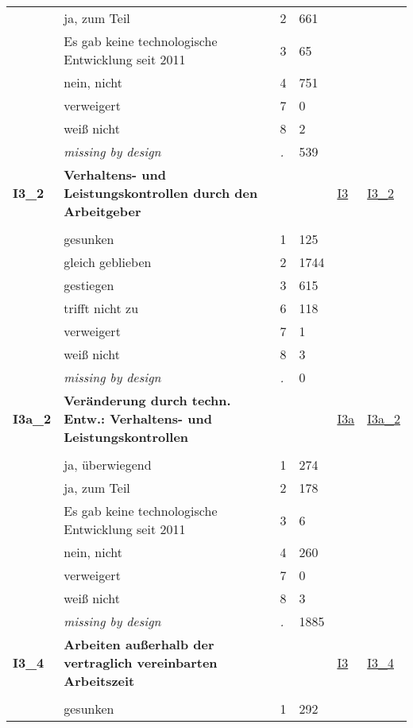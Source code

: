 \begin{longtable}{| L{2.45cm} | L{6cm} | C{1.5cm} | R{1cm} | C{2.25cm} | C{2.25cm} |}
   & ja, zum Teil & 2 & 661 &  &  \\ 
   & Es gab keine technologische Entwicklung seit 2011 & 3 & 65 &  &  \\ 
   & nein, nicht & 4 & 751 &  &  \\ 
   & verweigert & 7 & 0 &  &  \\ 
   & weiß nicht & 8 & 2 &  &  \\ 
   & \textit{missing by design} & \textit{.} & 539 &  &  \\ 
   \midrule
\textbf{I3\_2}\label{var:I3:2} & \textbf{Verhaltens- und Leistungskontrollen durch den Arbeitgeber} &  &  & \hyperref[I3]{I3} & \hyperref[var:suf:I3:2]{I3\_2} \\ 
   &  &  &  &  &  \\ 
   & gesunken & 1 & 125 &  &  \\ 
   & gleich geblieben & 2 & 1744 &  &  \\ 
   & gestiegen & 3 & 615 &  &  \\ 
   & trifft nicht zu & 6 & 118 &  &  \\ 
   & verweigert & 7 & 1 &  &  \\ 
   & weiß nicht & 8 & 3 &  &  \\ 
   & \textit{missing by design} & \textit{.} & 0 &  &  \\ 
   \midrule
\textbf{I3a\_2}\label{var:I3a:2} & \textbf{Veränderung durch techn. Entw.: Verhaltens- und Leistungskontrollen} &  &  & \hyperref[I3a]{I3a} & \hyperref[var:suf:I3a:2]{I3a\_2} \\ 
   &  &  &  &  &  \\ 
   & ja, überwiegend & 1 & 274 &  &  \\ 
   & ja, zum Teil & 2 & 178 &  &  \\ 
   & Es gab keine technologische Entwicklung seit 2011 & 3 & 6 &  &  \\ 
   & nein, nicht & 4 & 260 &  &  \\ 
   & verweigert & 7 & 0 &  &  \\ 
   & weiß nicht & 8 & 3 &  &  \\ 
   & \textit{missing by design} & \textit{.} & 1885 &  &  \\ 
   \midrule
\textbf{I3\_4}\label{var:I3:4} & \textbf{Arbeiten außerhalb der vertraglich vereinbarten Arbeitszeit} &  &  & \hyperref[I3]{I3} & \hyperref[var:suf:I3:4]{I3\_4} \\ 
   &  &  &  &  &  \\ 
   & gesunken & 1 & 292 &  &  \\ 

\end{longtable}
